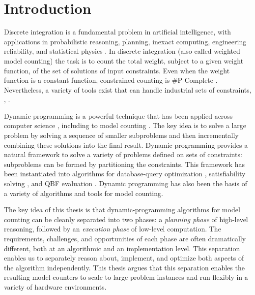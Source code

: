 \chapter{Introduction}
\label{ch:intro}
Discrete integration is a fundamental problem in artificial intelligence, with applications in probabilistic reasoning, planning, inexact computing, engineering reliability, and statistical physics \cite{Bacchus2003,DH07,GSS08,naveh2007constraint}. 
In discrete integration (also called weighted model counting) the task is to count the total weight, subject to a given weight function, of the set of solutions of input constraints.
Even when the weight function is a constant function, constrained counting is \#P-Complete \cite{Valiant79}. 
Nevertheless, a variety of tools exist that can handle industrial sets of constraints, \eg, \cite{sang2004combining,OD15,darwiche2004new,LM17}. 


Dynamic programming is a powerful technique that has been applied across computer science \cite{bellman1966dynamic}, including to model counting \cite{BDP09,SS10,jegou2016improving}.
The key idea is to solve a large problem by solving a sequence of smaller subproblems and then incrementally combining these solutions into the final result.
Dynamic programming provides a natural framework to solve a variety of problems defined on sets of constraints: subproblems can be formed by partitioning the constraints.
This framework has been instantiated into algorithms for database-query optimization \cite{MPPV04}, satisfiability solving \cite{uribe1994ordered,aguirre2001random,pan2005symbolic}, and QBF evaluation \cite{charwat2016bdd}. 
Dynamic programming has also been the basis of a variety of algorithms \cite{FMR08,SS10} and tools \cite{CW16,FHMW17,FHWZ18,FHZ19,DPV20,fichte2020exploiting} for model counting.

The key idea of this thesis is that dynamic-programming algorithms for model counting can be cleanly separated into two phases: a \emph{planning phase} of high-level reasoning, followed by an \emph{execution phase} of low-level computation. 
The requirements, challenges, and opportunities of each phase are often dramatically different, both at an algorithmic and an implementation level.  
This separation enables us to separately reason about, implement, and optimize both aspects of the algorithm independently.
This thesis argues that this separation enables the resulting model counters to scale to large problem instances and run flexibly in a variety of hardware environments.

